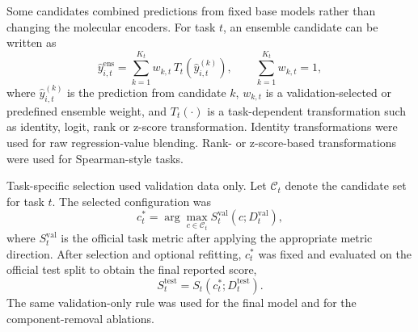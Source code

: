 \documentclass[10pt]{article}
\begin{document}
Some candidates combined predictions from fixed base models rather than changing the molecular encoders. For task $t$, an ensemble candidate can be written as
\begin{equation}
  \hat{y}_{i,t}^{\mathrm{ens}}
  =
  \sum_{k=1}^{K_t} w_{k,t}\,T_t\!\left(\hat{y}_{i,t}^{(k)}\right),
  \qquad
  \sum_{k=1}^{K_t} w_{k,t}=1,
\end{equation}
where $\hat{y}_{i,t}^{(k)}$ is the prediction from candidate $k$, $w_{k,t}$ is a validation-selected or predefined ensemble weight, and $T_t(\cdot)$ is a task-dependent transformation such as identity, logit, rank or z-score transformation. Identity transformations were used for raw regression-value blending. Rank- or z-score-based transformations were used for Spearman-style tasks.

Task-specific selection used validation data only. Let $\mathcal{C}_t$ denote the candidate set for task $t$. The selected configuration was
\begin{equation}
  c_t^{\ast}
  =
  \arg\max_{c \in \mathcal{C}_t}
  S_t^{\mathrm{val}}\!\left(c;D_t^{\mathrm{val}}\right),
\end{equation}
where $S_t^{\mathrm{val}}$ is the official task metric after applying the appropriate metric direction. After selection and optional refitting, $c_t^{\ast}$ was fixed and evaluated on the official test split to obtain the final reported score,
\begin{equation}
  S_t^{\mathrm{test}}
  =
  S_t\!\left(c_t^{\ast};D_t^{\mathrm{test}}\right).
\end{equation}
The same validation-only rule was used for the final model and for the component-removal ablations.
\end{document}
